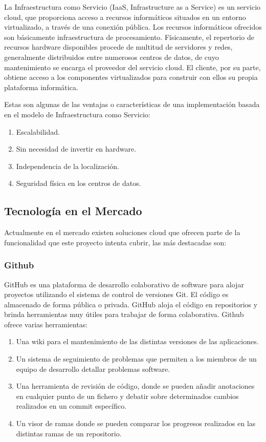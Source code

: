 \documentclass[a4paper,11pt]{book}
\begin{document}
La Infraestructura como Servicio\cite{iaas} (IaaS, Infrastructure as a Service) es un servicio cloud, que proporciona acceso a recursos informáticos situados en un entorno virtualizado, a través de una conexión pública. Los recursos informáticos ofrecidos  son básicamente infraestructura de procesamiento. Físicamente, el repertorio de recursos hardware disponibles procede de multitud de servidores y redes, generalmente distribuidos entre numerosos centros de datos, de cuyo mantenimiento se encarga el proveedor del servicio cloud. El cliente, por su parte, obtiene acceso a los componentes virtualizados para construir con ellos su propia plataforma informática.

Estas son algunas de las ventajas o características de una implementación basada en el modelo de Infraestructura como Servicio:

\begin{enumerate}
\item Escalabilidad.
\item Sin necesidad de invertir en hardware.
\item Independencia de la localización.
\item Seguridad física en los centros de datos.
\end{enumerate}

\subsection{Tecnología en el Mercado}\label{mercado}

Actualmente en el mercado existen soluciones cloud que ofrecen parte de la funcionalidad que este proyecto intenta cubrir, las más destacadas son: 


\subsubsection{Github}

GitHub\cite{github} es una plataforma de desarrollo colaborativo de software para alojar proyectos utilizando el sistema de control de versiones Git. El código es almacenado de forma pública o privada. GitHub aloja el código en repositorios y brinda herramientas muy útiles para trabajar de forma colaborativa. Github\cite{github2} ofrece varias herramientas:

\begin{enumerate}
\item Una wiki para el mantenimiento de las distintas versiones de las aplicaciones.
\item Un sistema de seguimiento de problemas que permiten a los miembros de un equipo de desarrollo detallar problemas software.
\item Una herramienta de revisión de código, donde se pueden añadir anotaciones en cualquier punto de un fichero y debatir sobre determinados cambios realizados en un commit específico.
\item Un visor de ramas donde se pueden comparar los progresos realizados en las distintas ramas de un repositorio.
\end{enumerate}
\end{document}
